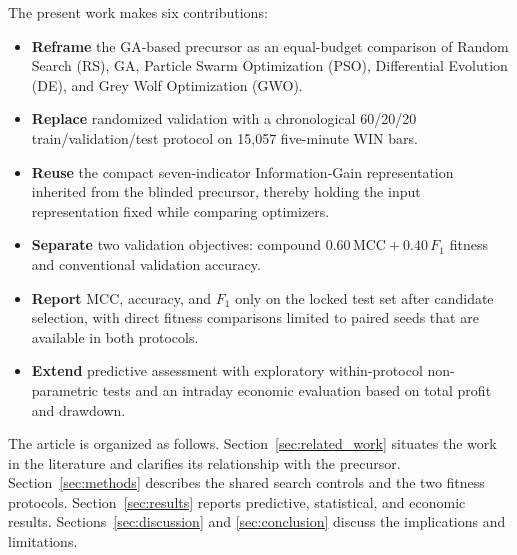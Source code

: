 The present work makes six contributions:

\begin{itemize}
    \item \textbf{Reframe} the GA-based precursor as an equal-budget comparison of Random Search (RS), GA, Particle Swarm Optimization (PSO), Differential Evolution (DE), and Grey Wolf Optimization (GWO).
    \item \textbf{Replace} randomized validation with a chronological 60/20/20 train/validation/test protocol on 15,057 five-minute WIN bars.
    \item \textbf{Reuse} the compact seven-indicator Information-Gain representation inherited from the blinded precursor, thereby holding the input representation fixed while comparing optimizers.
    \item \textbf{Separate} two validation objectives: compound $0.60\,\mathrm{MCC}+0.40\,F_1$ fitness and conventional validation accuracy.
    \item \textbf{Report} MCC, accuracy, and $F_1$ only on the locked test set after candidate selection, with direct fitness comparisons limited to paired seeds that are available in both protocols.
    \item \textbf{Extend} predictive assessment with exploratory within-protocol non-parametric tests and an intraday economic evaluation based on total profit and drawdown.
\end{itemize}

The article is organized as follows. Section~\ref{sec:related_work} situates the work in the literature and clarifies its relationship with the precursor. Section~\ref{sec:methods} describes the shared search controls and the two fitness protocols. Section~\ref{sec:results} reports predictive, statistical, and economic results. Sections~\ref{sec:discussion} and \ref{sec:conclusion} discuss the implications and limitations.
